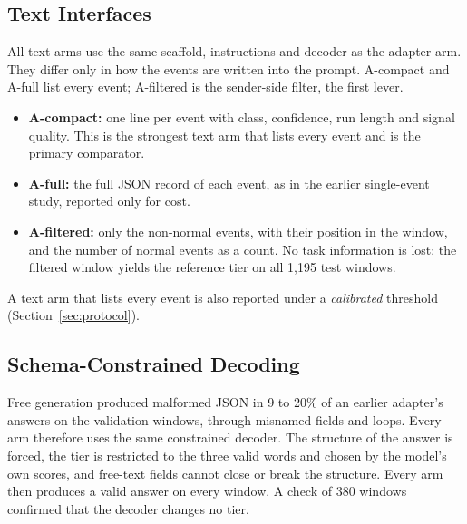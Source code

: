 \subsection{Text Interfaces}
All text arms use the same scaffold, instructions and decoder as the adapter arm. They differ only in how the events are written into the prompt. A-compact and A-full list every event; A-filtered is the sender-side filter, the first lever.
\begin{itemize}
\item \textbf{A-compact:} one line per event with class, confidence, run length and signal quality. This is the strongest text arm that lists every event and is the primary comparator.
\item \textbf{A-full:} the full JSON record of each event, as in the earlier single-event study, reported only for cost.
\item \textbf{A-filtered:} only the non-normal events, with their position in the window, and the number of normal events as a count. No task information is lost: the filtered window yields the reference tier on all 1,195 test windows.
\end{itemize}
A text arm that lists every event is also reported under a \emph{calibrated} threshold (Section~\ref{sec:protocol}).

\subsection{Schema-Constrained Decoding}
Free generation produced malformed JSON in 9 to 20\% of an earlier adapter's answers on the validation windows, through misnamed fields and loops. Every arm therefore uses the same constrained decoder. The structure of the answer is forced, the tier is restricted to the three valid words and chosen by the model's own scores, and free-text fields cannot close or break the structure. Every arm then produces a valid answer on every window. A check of 380 windows confirmed that the decoder changes no tier.
